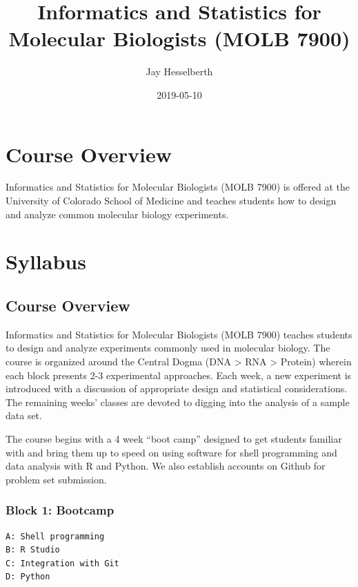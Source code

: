 \documentclass[]{book}
\title{Informatics and Statistics for Molecular Biologists (MOLB 7900)}
\author{Jay Hesselberth}
\date{2019-05-10}
\begin{document}
\maketitle

{
\setcounter{tocdepth}{1}
\tableofcontents
}
\hypertarget{course-overview}{%
\chapter*{Course Overview}\label{course-overview}}

Informatics and Statistics for Molecular Biologists (MOLB 7900) is offered at the University of Colorado School of Medicine and teaches students how to design and analyze common molecular biology experiments.

\hypertarget{syllabus}{%
\chapter*{Syllabus}\label{syllabus}}

\hypertarget{course-overview-1}{%
\section{Course Overview}\label{course-overview-1}}

Informatics and Statistics for Molecular Biologists (MOLB 7900) teaches students to design and analyze experiments commonly used in molecular biology. The course is organized around the Central Dogma (DNA \textgreater{} RNA \textgreater{} Protein) wherein each block presents 2-3 experimental approaches. Each week, a new experiment is introduced with a discussion of appropriate design and statistical considerations. The remaining weeks' classes are devoted to digging into the analysis of a sample data set.

The course begins with a 4 week ``boot camp'' designed to get students familiar with and bring them up to speed on using software for shell programming and data analysis with R and Python. We also establish accounts on Github for problem set submission.

\hypertarget{block-1-bootcamp}{%
\subsection{Block 1: Bootcamp}\label{block-1-bootcamp}}

\begin{verbatim}
A: Shell programming
B: R Studio
C: Integration with Git
D: Python
\end{verbatim}
\end{document}
